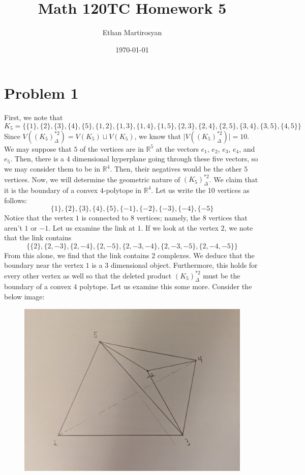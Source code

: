 \documentclass[12pt]{article}
\newcommand{\rr}{{\mathbb R}}
\begin{document}
 
\title{Math 120TC Homework 5}
\author{Ethan Martirosyan}
\date{\today}
\maketitle
{}
\hfuzz=50pt
\section*{Problem 1}
First, we note that \[K_5 = \{\{1\},\{2\},\{3\},\{4\},\{5\},\{1,2\},\{1,3\},\{1,4\},\{1,5\},\{2,3\},\{2,4\},\{2,5\},\{3,4\},\{3,5\},\{4,5\}\}\] Since $V((K_{5})_\Delta^{*2}) = V(K_5) \sqcup V(K_5)$, we know that $\vert V((K_{5})_\Delta^{*2}) \vert = 10$. We may suppose that $5$ of the vertices are in $\rr^5$ at the vectors $e_1$, $e_2$, $e_3$, $e_4$, and $e_5$. Then, there is a $4$ dimensional hyperplane going through these five vectors, so we may consider them to be in $\rr^4$. Then, their negatives would be the other $5$ vertices. Now, we will determine the geometric nature of $(K_{5})_\Delta^{*2}$. We claim that it is the boundary of a convex $4$-polytope in $\rr^4$. Let us write the 10 vertices as follows:
\[
\{1\},\{2\},\{3\},\{4\},\{5\},\{-1\},\{-2\},\{-3\},\{-4\},\{-5\}
\] Notice that the vertex $1$ is connected to $8$ vertices; namely, the $8$ vertices that aren't $1$ or $-1$. Let us examine the link at $1$. If we look at the vertex $2$, we note that the link contains 
\[
\{\{2\}, \{2,-3\}, \{2,-4\}, \{2,-5\}, \{2,-3,-4\}, \{2,-3,-5\}, \{2,-4,-5\}\}
\] From this alone, we find that the link contains $2$ complexes. We deduce that the boundary near the vertex $1$ is a $3$ dimensional object. Furthermore, this holds for every other vertex as well so that the deleted product $(K_5)^{*2}_{\Delta}$ must be the boundary of a convex $4$ polytope. Let us examine this some more. Consider the below image:
\begin{figure}[H]
\centering
\includegraphics[width=\textwidth]{Image1}
\end{figure}
\end{document}
